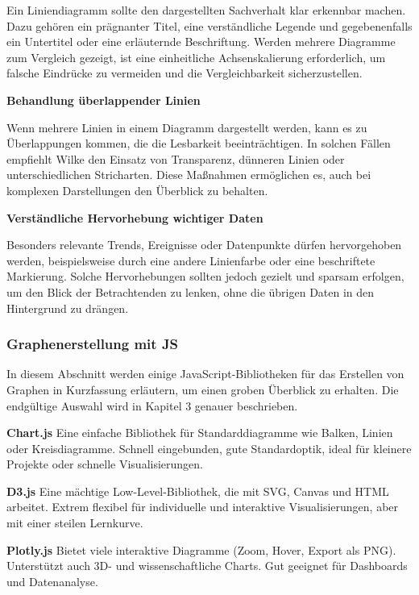Ein Liniendiagramm sollte den dargestellten Sachverhalt klar erkennbar machen.
Dazu gehören ein prägnanter Titel, eine verständliche Legende und gegebenenfalls ein Untertitel oder eine erläuternde Beschriftung.
Werden mehrere Diagramme zum Vergleich gezeigt, ist eine einheitliche Achsenskalierung erforderlich, um falsche Eindrücke zu vermeiden und die Vergleichbarkeit sicherzustellen.

\item
\textbf{Behandlung überlappender Linien}

Wenn mehrere Linien in einem Diagramm dargestellt werden, kann es zu Überlappungen kommen, die die Lesbarkeit beeinträchtigen.
In solchen Fällen empfiehlt Wilke den Einsatz von Transparenz, dünneren Linien oder unterschiedlichen Stricharten.
Diese Maßnahmen ermöglichen es, auch bei komplexen Darstellungen den Überblick zu behalten.
\item
\textbf{Verständliche Hervorhebung wichtiger Daten}

Besonders relevante Trends, Ereignisse oder Datenpunkte dürfen hervorgehoben werden, beispielsweise durch eine andere Linienfarbe oder eine beschriftete Markierung.
Solche Hervorhebungen sollten jedoch gezielt und sparsam erfolgen, um den Blick der Betrachtenden zu lenken, ohne die übrigen Daten in den Hintergrund zu drängen.

\subsubsection{Graphenerstellung mit JS}

In diesem Abschnitt werden einige JavaScript-Bibliotheken für das Erstellen von Graphen
in Kurzfassung erläutern, um einen groben Überblick zu erhalten.
Die endgültige Auswahl wird in Kapitel 3 genauer beschrieben.

\textbf{Chart.js}
Eine einfache Bibliothek für Standarddiagramme wie Balken, Linien
oder Kreisdiagramme.
Schnell eingebunden, gute Standardoptik, ideal für kleinere Projekte oder schnelle Visualisierungen. \cite{Chartjs2025}

\textbf{D3.js}
Eine mächtige Low-Level-Bibliothek, die mit \ac{SVG}, Canvas und HTML arbeitet.
Extrem flexibel für individuelle und interaktive Visualisierungen, aber mit einer steilen Lernkurve. \cite{D3js2025}

\textbf{Plotly.js}
Bietet viele interaktive Diagramme (Zoom, Hover, Export als PNG). Unterstützt
auch 3D- und wissenschaftliche Charts.
Gut geeignet für Dashboards und Datenanalyse. \cite{Plotlyjs2025}

